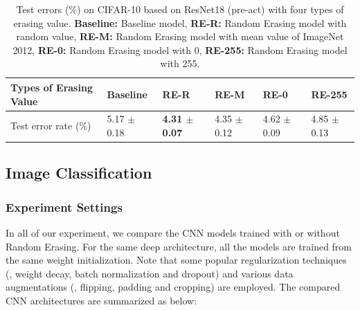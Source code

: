 \documentclass[10pt,twocolumn,letterpaper]{article}
\begin{document}
\begin{table}
\footnotesize
\begin{center}
%
%
\begin{tabularx}{\linewidth}{ l|C|C|C|C|C}
\hline
Types of Erasing Value & Baseline & RE-R & RE-M & RE-0 & RE-255  \\
\hline
\hline
Test error rate (\%)& 5.17 $\pm$ 0.18 & \textbf{4.31 $\pm$ 0.07} & 4.35 $\pm$ 0.12 & 4.62 $\pm$ 0.09 & 4.85 $\pm$ 0.13\\
\hline
\end{tabularx}
\end{center}
\vspace{-.1in}
\caption{\label{tabel:Erasing Value} Test errors (\%) on CIFAR-10 based on ResNet18 (pre-act) with four types of erasing value. \textbf{Baseline:} Baseline model, \textbf{RE-R:} Random Erasing model with random value, \textbf{RE-M:} Random Erasing model with mean value of ImageNet 2012, \textbf{RE-0:} Random Erasing model with 0, \textbf{RE-255:} Random Erasing model with 255.}
\end{table}


\subsection{Image Classification}


\subsubsection{Experiment Settings} In all of our experiment, we compare the CNN models trained with or without Random Erasing. For the same deep architecture, all the models are trained from the same weight initialization. Note that some popular regularization techniques (\eg, weight decay, batch normalization and dropout) and various data augmentations (\eg, flipping, padding and cropping) are employed. The compared CNN architectures are summarized as below:
\end{document}
